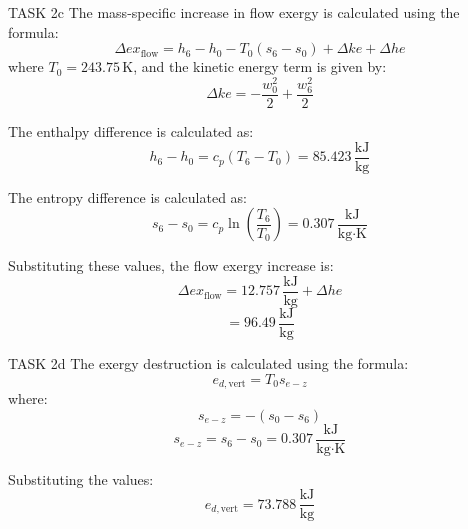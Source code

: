 TASK 2c  
The mass-specific increase in flow exergy is calculated using the formula:  
\[
\Delta ex_{\text{flow}} = h_6 - h_0 - T_0 (s_6 - s_0) + \Delta ke + \Delta he
\]  
where \( T_0 = 243.75 \, \text{K} \), and the kinetic energy term is given by:  
\[
\Delta ke = -\frac{w_0^2}{2} + \frac{w_6^2}{2}
\]  

The enthalpy difference is calculated as:  
\[
h_6 - h_0 = c_p (T_6 - T_0) = 85.423 \, \frac{\text{kJ}}{\text{kg}}
\]  

The entropy difference is calculated as:  
\[
s_6 - s_0 = c_p \ln \left( \frac{T_6}{T_0} \right) = 0.307 \, \frac{\text{kJ}}{\text{kg·K}}
\]  

Substituting these values, the flow exergy increase is:  
\[
\Delta ex_{\text{flow}} = 12.757 \, \frac{\text{kJ}}{\text{kg}} + \Delta he
\]  
\[
= 96.49 \, \frac{\text{kJ}}{\text{kg}}
\]  

TASK 2d  
The exergy destruction is calculated using the formula:  
\[
e_{d,\text{vert}} = T_0 s_{e-z}
\]  
where:  
\[
s_{e-z} = -(s_0 - s_6)
\]  
\[
s_{e-z} = s_6 - s_0 = 0.307 \, \frac{\text{kJ}}{\text{kg·K}}
\]  

Substituting the values:  
\[
e_{d,\text{vert}} = 73.788 \, \frac{\text{kJ}}{\text{kg}}
\]